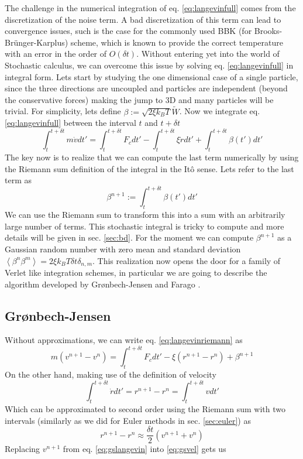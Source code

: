\documentclass[ twoside,openright,titlepage,numbers=noenddot,%
headinclude,footinclude,cleardoublepage=empty,abstract=on,
BCOR=5mm,paper=a4,fontsize=11pt, dvipsnames
]{scrreprt}
\newcommand{\dt}{\delta t}
\newcommand{\kT}{k_B T}
\begin{document}
The challenge in the numerical integration of eq. \eqref{eq:langevinfull} comes from the discretization of the noise term.
A bad discretization of this term can lead to convergence issues, such is the case for the commonly used BBK (for Brooks-Brünger-Karplus) scheme\cite{Brunger1984}, which is known to provide the correct temperature with an error in the order of $O(\dt)$\cite{Wang2003}.
Without entering yet into the world of Stochastic calculus, we can overcome this issue by solving eq. \eqref{eq:langevinfull} in integral form. Lets start by studying the one dimensional case of a single particle, since the three directions are uncoupled and particles are independent (beyond the conservative forces) making the jump to 3D and many particles will be trivial. For simplicity, lets define $\beta := \sqrt{2\xi k_BT}\widetilde{W}$. Now we integrate eq. \eqref{eq:langevinfull} between the interval $t$ and $t+\dt$
\begin{equation}
  \label{eq:langevinriemann}
  \int_t^{t+\dt} m\dot{v}dt' = \int_t^{t+\dt}F_c dt' - \int_t^{t+\dt}\xi\dot{r}dt' + \int_t^{t+\dt}\beta(t')dt'
\end{equation}
The key now is to realize that we can compute the last term numerically by using the Riemann sum definition of the integral in the Itô sense. Lets refer to the last term as
\begin{equation}
  \label{eq:langenoisint}
  \beta^{n+1} := \int_t^{t+\dt}\beta(t')dt'
\end{equation}
We can use the Riemann sum to transform this into a sum with an arbitrarily large number of terms. This stochastic integral is tricky to compute and more details will be given in sec. \ref{sec:bd}. For the moment we can compute $\beta^{n+1}$ as a Gaussian random number with zero mean and standard deviation $\left\langle\beta^n\beta^m\right\rangle = 2\xi\kT\dt\delta_{n,m}$.
This realization now opens the door for a family of Verlet like integration schemes, in particular we are going to describe the algorithm developed by Grønbech-Jensen and Farago \cite{Gronbech2013}.

\subsection{Grønbech-Jensen}\label{sec:gronbechjensen}
Without approximations, we can write eq. \eqref{eq:langevinriemann} as
\begin{equation}
  \label{eq:gslangevin}
  m\left(v^{n+1}-v^n\right) = \int_t^{t+\dt}F_c dt' - \xi\left(r^{n+1}-r^n\right) + \beta^{n+1}
\end{equation}
On the other hand, making use of the definition of velocity
\begin{equation}
  \int_t^{t+\dt}\dot{r}dt' = r^{n+1} - r^n = \int_t^{t+\dt}vdt'
\end{equation}
Which can be approximated to second order using the Riemann sum with two intervals (similarly as we did for Euler methods in sec. \ref{sec:euler}) as
\begin{equation}
  \label{eq:gsvel}
  r^{n+1} - r^n \approx \frac{\dt}{2}\left(v^{n+1}+v^n\right)
\end{equation}
Replacing $v^{n+1}$ from eq. \eqref{eq:gslangevin} into \eqref{eq:gsvel} gets us
\end{document}

